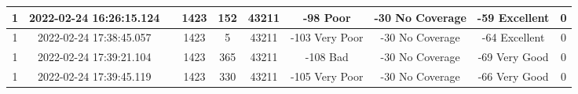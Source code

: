\begin{longtable*}{|c|c|c|c|c|c|c|c|c|c|}
1&2022-02-24 16:26:15.124&&1423&152&43211& -98       Poor        & -30       No Coverage & -59       Excellent   & 0\\\hline
{}1&2022-02-24 17:38:45.057&&1423&5&43211& -103      Very Poor   & -30       No Coverage & -64       Excellent   & 0\\\hline
{}1&2022-02-24 17:39:21.104&&1423&365&43211& -108      Bad         & -30       No Coverage & -69       Very Good   & 0\\\hline
{}1&2022-02-24 17:39:45.119&&1423&330&43211& -105      Very Poor   & -30       No Coverage & -66       Very Good   & 0\\\hline
\end{longtable*}
